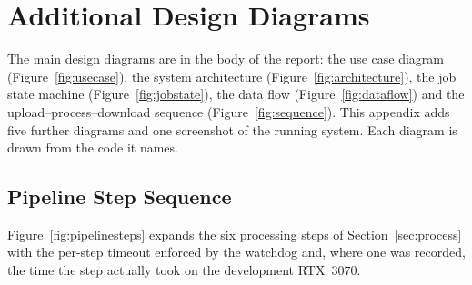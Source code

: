 \chapter{Additional Design Diagrams}

The main design diagrams are in the body of the report: the use case diagram (Figure~\ref{fig:usecase}), the system architecture (Figure~\ref{fig:architecture}), the job state machine (Figure~\ref{fig:jobstate}), the data flow (Figure~\ref{fig:dataflow}) and the upload--process--download sequence (Figure~\ref{fig:sequence}). This appendix adds five further diagrams and one screenshot of the running system. Each diagram is drawn from the code it names.

\section{Pipeline Step Sequence}
Figure~\ref{fig:pipelinesteps} expands the six processing steps of Section~\ref{sec:process} with the per-step timeout enforced by the watchdog and, where one was recorded, the time the step actually took on the development RTX~3070.


